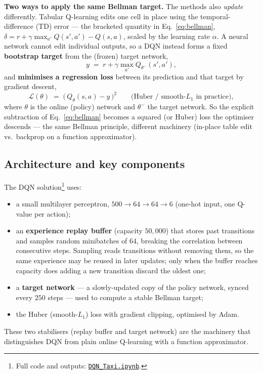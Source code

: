 \documentclass[11pt]{article}
\begin{document}
\smallskip\noindent\textbf{Two ways to apply the same Bellman target.} The methods also
\emph{update} differently. Tabular Q-learning edits one cell in place using the
temporal-difference (TD) error --- the bracketed quantity in Eq.~\eqref{eq:bellman},
$\delta = r + \gamma \max_{a'} Q(s',a') - Q(s,a)$, scaled by the learning rate $\alpha$. A neural
network cannot edit individual outputs, so a DQN instead forms a fixed \textbf{bootstrap target}
from the (frozen) target network,
\[
  y \;=\; r + \gamma \max_{a'} Q_{\theta^-}(s',a'),
\]
and \textbf{minimises a regression loss} between its prediction and that target by gradient descent,
\[
  \mathcal{L}(\theta) \;=\; \bigl(\,Q_{\theta}(s,a) - y\,\bigr)^2
  \qquad\text{(Huber / smooth-}L_1\text{ in practice)},
\]
where $\theta$ is the online (policy) network and $\theta^-$ the target network. So the explicit
subtraction of Eq.~\eqref{eq:bellman} becomes a squared (or Huber) loss the optimiser descends ---
the same Bellman principle, different machinery (in-place table edit vs.\ backprop on a function
approximator).

\subsection{Architecture and key components}
The DQN solution\footnote{Full code and outputs: \href{https://github.com/asugar13/rl-taxi-pong/blob/main/DQN_Taxi.ipynb}{\texttt{DQN\_Taxi.ipynb}}.} uses:
\begin{itemize}[noitemsep]
  \item a small multilayer perceptron, $500 \rightarrow 64 \rightarrow 64 \rightarrow 6$
        (one-hot input, one Q-value per action);
  \item an \textbf{experience replay buffer} (capacity $50{,}000$) that stores past transitions
        and samples random minibatches of $64$, breaking the correlation between consecutive
        steps. Sampling reads transitions without removing them, so the same experience may be
        reused in later updates; only when the buffer reaches capacity does adding a new
        transition discard the oldest one;
  \item a \textbf{target network} --- a slowly-updated copy of the policy network, synced every
        $250$ steps --- used to compute a stable Bellman target;
  \item the Huber (smooth-$L_1$) loss with gradient clipping, optimised by Adam.
\end{itemize}
These two stabilisers (replay buffer and target network) are the machinery that distinguishes
DQN from plain online Q-learning with a function approximator.
\end{document}
